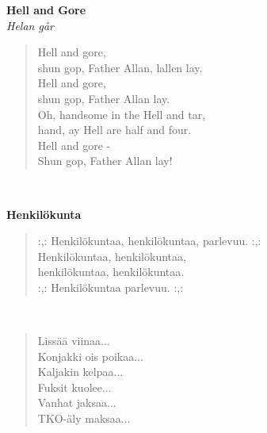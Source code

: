 %
%
\noindent\begin{minipage}{\linewidth}
\vspace{5pt}
\parbox[t]{0.85\linewidth}{\raggedright {\large\bf Hell and Gore}\\[2pt]\small\emph{Helan går}\\[6pt]}
\begin{verse}
	
	Hell and gore,\\
	shun gop, Father Allan, lallen lay.\\
	Hell and gore,\\
	shun gop, Father Allan lay.\\
	Oh, handsome in the Hell and tar,\\
	hand, ay Hell are half and four.\\
	Hell and gore -\\
	Shun gop, Father Allan lay!\\
	
\end{verse}
\end{minipage}\\[10pt]
%
%
\noindent\begin{minipage}{\linewidth}
\vspace{5pt}
\parbox[t]{0.85\linewidth}{\raggedright {\large\bf Henkilökunta}\\[6pt]}
\begin{verse}
	\hspace{0pt-\widthof{:,: }}:,: Henkilökuntaa, henkilökuntaa, parlevuu. :,:\\
	Henkilökuntaa, henkilökuntaa,\\
	henkilökuntaa, henkilökuntaa.\\
	\hspace{0pt-\widthof{:,: }}:,: Henkilökuntaa parlevuu. :,:\\
\end{verse}
\end{minipage}\\[10pt]
\noindent\begin{minipage}{\linewidth}
\begin{verse}
	Lissää viinaa...\\
	Konjakki ois poikaa...\\
	Kaljakin kelpaa...\\
	Fuksit kuolee...\\
	Vanhat jaksaa...\\
	TKO-äly maksaa...\\
\end{verse}
\end{minipage}\\[10pt]
